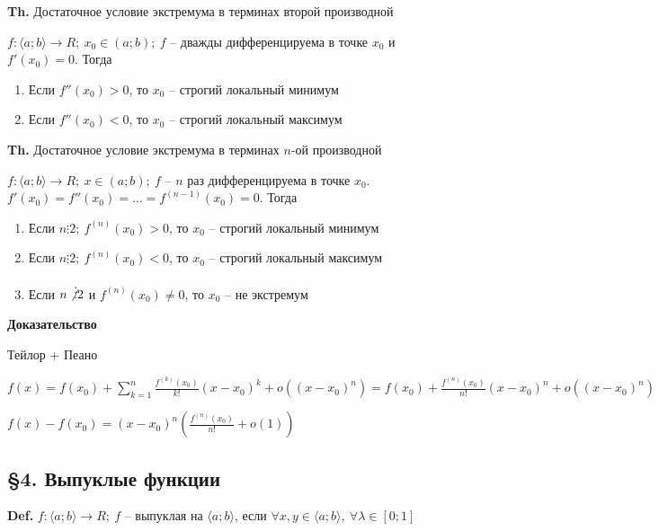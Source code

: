 \documentclass[14pt, letter paper]{article}
\newcommand{\q}[1]{\langle #1 \rangle}
\begin{document}
\vspace{5mm}

\textbf{Th.} Достаточное условие экстремума в терминах второй производной

$f : \q{a; b} \rightarrow R;\ x_0 \in (a; b);\ f$ -- дважды дифференцируема в точке $x_0$ и $f'(x_0) = 0$. Тогда

\begin{enumerate}
    \item Если $f''(x_0) > 0$, то $x_0$ -- строгий локальный минимум
    \item Если $f''(x_0) < 0$, то $x_0$ -- строгий локальный максимум
\end{enumerate}

\textbf{Th.} Достаточное условие экстремума в терминах $n$-ой производной

$f : \q{a; b} \rightarrow R;\ x \in (a; b);\ f$ -- $n$ раз дифференцируема в точке $x_0$. $f'(x_0) = f''(x_0) = \ldots = f^{(n - 1)}(x_0) = 0$. Тогда

\begin{enumerate}
    \item Если $n \vdots 2;\ f^{(n)}(x_0) > 0$, то $x_0$ -- строгий локальный минимум
    \item Если $n \vdots 2;\ f^{(n)}(x_0) < 0$, то $x_0$ -- строгий локальный максимум
    \item Если $n \not \vdots 2$ и $f^{(n)}(x_0) \neq 0$, то $x_0$ -- не экстремум
\end{enumerate}

\begin{center}
    \textbf{Доказательство}
\end{center}

Тейлор + Пеано

$f(x) = f(x_0) + \sum\limits_{k = 1}^n \frac{f^{(k)}(x_0)}{k!}(x - x_0)^k + o((x - x_0)^n) = f(x_0) + \frac{f^{(n)}(x_0)}{n!}(x - x_0)^n + o((x - x_0)^n)$

$f(x) - f(x_0) = (x - x_0)^n (\frac{f^{(n)}(x_0)}{n!} + o(1))$

\begin{center}
    \subsection*{\S 4. Выпуклые функции}
\end{center}

\textbf{Def.} $f : \q{a; b} \rightarrow R;\ f$ -- выпуклая на $\q{a; b}$, если $\forall x, y \in \q{a; b},\ \forall \lambda \in [0; 1]$ 
\end{document}
